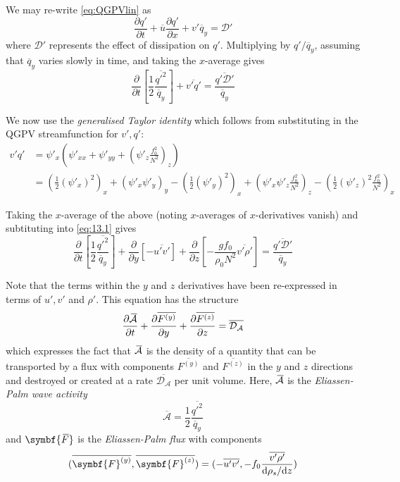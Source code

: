 \documentclass{jknotes}
\newcommand{\myol}[2][3]{{}\mkern#1mu\overline{\mkern-#1mu#2}}
\begin{document}
We may re-write \eqref{eq:QGPVlin} as
\begin{equation}
	\frac{\partial q'}{\partial t} + \overline{u} \frac{\partial q'}{\partial
	x} + v' \overline{q}_y = \mathcal{D}'
\end{equation}
where $\mathcal{D}'$ represents the effect of dissipation on $q'$. Multiplying
by $q'/\overline{q}_y$, assuming that $\overline{q}_y$ varies slowly in
time, and taking the $x$-average gives
\begin{equation}
	\frac{\partial}{\partial t}\left[ \frac{1}{2}
		\frac{\overline{q'^2}}{\overline{q}_y}\right] +\overline{v'q'} =
		\frac{\overline{q' \mathcal{D}'}}{\overline{q}_y}
		\label{eq:13.1}
\end{equation}

We now use the \emph{generalised Taylor identity} which follows from
substituting in the QGPV streamfunction for $v', q'$:
\begin{align}
	v'q' &= \psi'_x \left(\psi'_{xx} + \psi'_{yy} + \left(\psi'_z
	\frac{f_0^2}{N^2}\right)_z\right) \\
	&= \left( \frac{1}{2} (\psi'_x)^2\right)_x + \left(\psi'_x\psi'_y\right)_y -
	\left(\frac{1}{2}(\psi'_y)^2\right)_x + \left( \psi'_x \psi'_z
		\frac{f_0^2}{N^2} \right)_z - \left(\frac{1}{2}(\psi'_z)^2
	\frac{f_0^2}{N^2}\right)_x
\end{align}

Taking the $x$-average of the above (noting $x$-averages of $x$-derivatives
vanish) and subtituting into \eqref{eq:13.1} gives
\begin{equation}
	\frac{\partial}{\partial t}\left[ \frac{1}{2}
		\frac{\overline{q'^2}}{\overline{q}_y}\right] +
		\frac{\partial}{\partial y} \left[ -\overline{u'v'}\right] +
		\frac{\partial}{\partial z} \left[ -\frac{gf_0}{\rho_0N^2}
		\overline{v'\rho'}\right]	
		= \frac{\overline{q' \mathcal{D}'}}{\overline{q}_y}
\end{equation}

Note that the terms within the $y$ and $z$ derivatives have been re-expressed
in terms of $u', v'$ and $\rho'$. This equation has the structure
\begin{equation}
	\frac{\partial \myol{\mathcal{A}}}{\partial t} + \frac{\partial
		\overline{F^{(y)}}}{\partial y} + \frac{\partial
	\overline{F^{(z)}}}{\partial z} = \overline{\mathcal{D}_{\mathcal{A}}}
\end{equation}
which expresses the fact that $\myol{\mathcal{A}}$ is the density of a
quantity that can be transported by a flux with components $\overline{F^{(y)}}
$ and $\overline{F^{(z)}}$ in the $y$ and $z$ directions and destroyed or
created at a rate $\overline{\mathcal{D}_{\mathcal{A}}}$ per unit volume.
Here, $\myol{\mathcal{A}}$ is the \emph{Eliassen-Palm wave activity} 
\begin{equation}
	\overline{\mathcal{A}} = \frac{1}{2}\frac{\overline{q'^2}}{\overline{q}_y}
\end{equation}
and $\symbf{\myol{F}}$ is the \emph{Eliassen-Palm flux} with components
\begin{equation}
	(\overline{\symbf{F}^{(y)}},\overline{\symbf{F}^{(z)}}) =
	(-\overline{u'v'},-f_0\frac{\overline{v'\rho'}}{\diffd
	\rho_s/\diffd z})
\end{equation}
\end{document}
